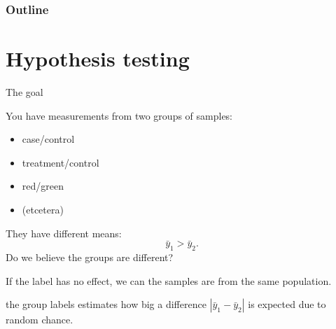 %
%
%



\subtitle{hypothesis testing, and the $t$ statistic}

\date{2 March 2015}





\begin{frame}
  \maketitle
\end{frame}


\begin{frame}\frametitle<presentation>{Outline}
  \tableofcontents
\end{frame}


\section{Hypothesis testing}

\begin{frame}{The goal}

    You have measurements from two groups of samples:
    \begin{itemize}
        \item case/control
        \item treatment/control
        \item red/green
        \item (etcetera)
    \end{itemize}

    \vspace{2em}

    They have different means:
    \[  \bar y_1 > \bar y_2 . \]
    Do we believe the groups are different?

    \vspace{2em}
    \pause

    \begin{block}{If the label has no effect,}
        we can the samples are from the \alert{same population}.
    \end{block}

    \vspace{2em}
    \pause

     the \alert{group labels}
    estimates how big a difference $|\bar y_1 - \bar y_2|$ is expected 
    due to random chance.

\end{frame}


